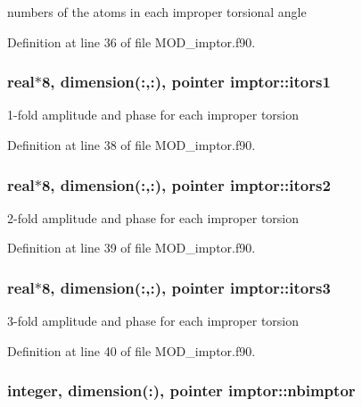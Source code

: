 numbers of the atoms in each improper torsional angle 



Definition at line 36 of file M\-O\-D\-\_\-imptor.\-f90.

\hypertarget{classimptor_a175cdae831c58f554bb5c73b4701bab7}{
\subsubsection[{itors1}]{\setlength{\rightskip}{0pt plus 5cm}real$\ast$8, dimension(\-:,\-:), pointer imptor\-::itors1}}\label{classimptor_a175cdae831c58f554bb5c73b4701bab7}


1-\/fold amplitude and phase for each improper torsion 



Definition at line 38 of file M\-O\-D\-\_\-imptor.\-f90.

\hypertarget{classimptor_a4afd041ca926d3c1d458925f3a9c1bcc}{
\subsubsection[{itors2}]{\setlength{\rightskip}{0pt plus 5cm}real$\ast$8, dimension(\-:,\-:), pointer imptor\-::itors2}}\label{classimptor_a4afd041ca926d3c1d458925f3a9c1bcc}


2-\/fold amplitude and phase for each improper torsion 



Definition at line 39 of file M\-O\-D\-\_\-imptor.\-f90.

\hypertarget{classimptor_a730fdcfc67bd37927a4e78b06b41bf4d}{
\subsubsection[{itors3}]{\setlength{\rightskip}{0pt plus 5cm}real$\ast$8, dimension(\-:,\-:), pointer imptor\-::itors3}}\label{classimptor_a730fdcfc67bd37927a4e78b06b41bf4d}


3-\/fold amplitude and phase for each improper torsion 



Definition at line 40 of file M\-O\-D\-\_\-imptor.\-f90.

\hypertarget{classimptor_a3c228f6a9483426d0f1a57b7fd3081f3}{
\subsubsection[{nbimptor}]{\setlength{\rightskip}{0pt plus 5cm}integer, dimension(\-:), pointer imptor\-::nbimptor}}\label{classimptor_a3c228f6a9483426d0f1a57b7fd3081f3}


